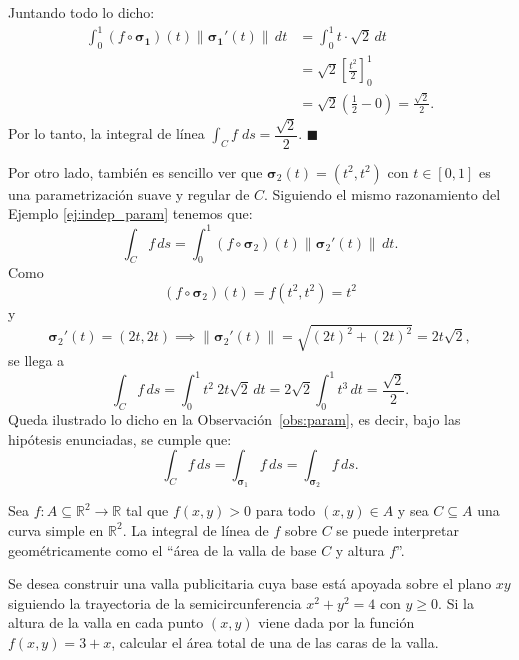 \noindent  Juntando todo lo dicho:
\begin{align*}
\int_{0}^{1} (f \circ \boldsymbol{\sigma_1})(t) \|\boldsymbol{\sigma_1}'(t)\|\,dt  &= \int_{0}^{1} t \cdot \sqrt{2}\,dt  \\[0.2cm]
&= \sqrt{2} \left[ \frac{t^2}{2} \right]_{0}^{1} \\[0.2cm]
&= \sqrt{2} \left( \frac{1}{2} - 0 \right) = \frac{\sqrt{2}}{2}.
\end{align*}
Por lo tanto, la integral de línea $\int_C f\;ds =\dfrac{\sqrt{2}}{2}$.  \hfill $\blacksquare$


\begin{obs}   Por otro lado, también es sencillo ver que $\boldsymbol{\sigma}_2(t)=(t^2,t^2)$ con $t\in[0,1]$ es una parametrización suave y regular de $C$. Siguiendo el mismo razonamiento del Ejemplo \ref{ej:indep_param} tenemos que: 
\[ 
\int_C f\,ds=\int_0^1 (f\circ\boldsymbol{\sigma}_2)(t)\|\boldsymbol{\sigma}_2'(t)\|\,dt. 
\] 
Como 
\[ 
(f\circ\boldsymbol{\sigma}_2)(t)= f(t^{2},t^{2}) = t^2 
\] 
y 
\[ 
\boldsymbol{\sigma}_2'(t)=(2t,2t)\implies\|\boldsymbol{\sigma}_2'(t)\|=\sqrt{(2t)^2+(2t)^2}=2t\sqrt{2}, 
\] 
se llega a 
\[ 
\int_C f\,ds=\int_0^1 t^2 \:  2t\sqrt{2} \, dt =2\sqrt{2}\int_0^1 t^3 \,dt = \frac{\sqrt{2}}{2}. 
\] 
Queda ilustrado lo dicho en la Observación~\ref{obs:param}, es decir, bajo las hipótesis enunciadas, se cumple que:
\[ 
\int_C f\,ds = \int_{\boldsymbol{\sigma}_1}f\,ds =\int_{\boldsymbol{\sigma}_2}f\,ds. \tag*{$\blacksquare$}
\]

\end{obs}

  

\begin{obs}\label{obs:valla}
Sea $f:A\subseteq\mathbb{R}^2 \to\mathbb{R}$ tal que $f(x,y) > 0$ para todo $(x,y) \in A$ y sea $C \subseteq A$ una curva simple en $\mathbb{R}^2$. La integral de línea de $f$ sobre $C$ se puede interpretar geométricamente como el ``área de la valla de base $C$ y altura $f$''. 
\end{obs}

\begin{example}
Se desea construir una valla publicitaria cuya base está apoyada sobre el plano $xy$ siguiendo la trayectoria de la semicircunferencia $x^2 + y^2 = 4$ con $y \ge 0$. Si la altura de la valla en cada punto $(x,y)$ viene dada por la función $f(x,y) = 3 + x$, calcular el área total de una de las caras de la valla.
\end{example}

